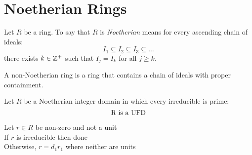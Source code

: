 \documentclass[letterpaper,12pt,fleqn]{article}
\begin{document}
\section*{Noetherian Rings}

\begin{definition}[Noetherian]
  Let $R$ be a ring. To say that $R$ is \emph{Noetherian} means for every
  ascending chain of ideals:
  \[I_1\subseteq I_2\subseteq I_3\subseteq\ldots\]
  there exists $k\in\mathbb{Z}^+$ such that $I_j=I_k$ for all $j\ge k$.

  A non-Noetherian ring is a ring that contains a chain of ideals with proper
  containment.
\end{definition}

\begin{theorem}
  Let $R$ be a Noetherian integer domain in which every irreducible is prime:
  \[$R$\ \mbox{is a UFD}\]
\end{theorem}

\begin{theproof}
  Let $r\in R$ be non-zero and not a unit \\
  If $r$ is irreducible then done \\
  Otherwise, $r=d_1r_1$ where neither are units \\
\end{theproof}
\end{document}
